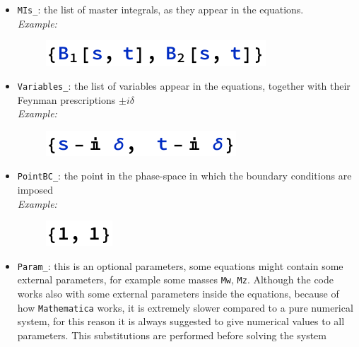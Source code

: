 \begin{itemize}
\begin{itemize}
        \item \texttt{MIs\_}: the list of master integrals, as they appear in the equations.\\
        
        \textit{Example:}
        \begin{figure}[!h]
            \centering
            \includegraphics[scale=0.75]{Images/Code3.pdf}
        \end{figure}
        
        \item \texttt{Variables\_}: the list of variables appear in the equations, together with their Feynman prescriptions $\pm i \delta$\\
        
        \textit{Example:}
        \begin{figure}[!h]
            \centering
            \includegraphics[scale=0.75]{Images/Code4.pdf}
        \end{figure}
        
        \item \texttt{PointBC\_}: the point in the phase-space in which the boundary conditions are imposed\\
        
        \textit{Example:}
        \begin{figure}[!h]
            \centering
            \includegraphics[scale=0.75]{Images/Code5.pdf}
        \end{figure}
        
        \item \texttt{Param\_}: this is an optional parameters, some equations might contain some external parameters, for example some masses \texttt{Mw}, \texttt{Mz}. Although the code works also with some external parameters inside the equations, because of how \texttt{Mathematica} works, it is extremely slower compared to a pure numerical system, for this reason it is always suggested to give numerical values to all parameters. This substitutions are performed before solving the system\\
        

\end{itemize}
\end{itemize}
